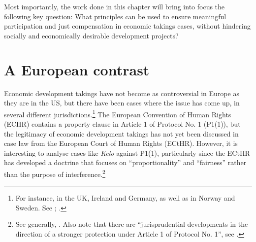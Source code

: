Most importantly, the work done in this chapter will bring into focus the following key question: What principles can be used to ensure meaningful participation and just compensation in economic takings cases, without hindering socially and economically desirable development projects?



\section{A European contrast}

Economic development takings have not become as controversial in Europe as they are in the US, but there have been cases where the issue has come up, in several different jurisdictions.\footnote{For instance, in the UK, Ireland and Germany, as well as in Norway and Sweden. See \cite[466-483]{walt11}; \cite{stenseth10}.} The European Convention of Human Rights (ECHR) contains a property clause in Article 1 of Protocol No. 1 (P1(1)), but the legitimacy of economic development takings has not yet been discussed in case law from the European Court of Human Rights (ECtHR). However, it is interesting to analyse cases like {\it Kelo} against P1(1), particularly since the ECtHR has developed a doctrine that focuses on ``proportionality'' and ``fairness'' rather than the purpose of interference.\footnote{See generally, \cite[Chapter 5]{allen05}. Also note that there are ``jurisprudential developments in the direction of a stronger protection under Article 1 of Protocol No. 1'', see \cite[135]{lindheim12}.}

